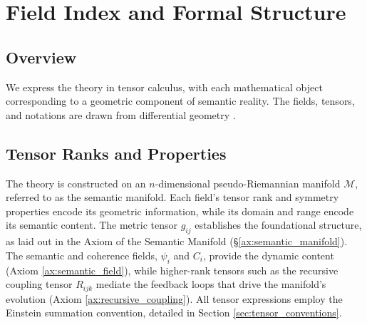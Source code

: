\chapter{Field Index and Formal Structure}

\section{Overview}

We express the theory in tensor calculus, with each mathematical object corresponding to a geometric component of semantic reality. The fields, tensors, and notations are drawn from differential geometry \autocite{Riemann1868, Lee2003}.

\section{Tensor Ranks and Properties}

The theory is constructed on an \(n\)-dimensional pseudo-Riemannian manifold \(\mathcal{M}\), referred to as the semantic manifold. Each field's tensor rank and symmetry properties encode its geometric information, while its domain and range encode its semantic content. The metric tensor \(g_{ij}\) establishes the foundational structure, as laid out in the Axiom of the Semantic Manifold (\S\ref{ax:semantic_manifold}). The semantic and coherence fields, \(\psi_i\) and \(C_i\), provide the dynamic content (Axiom \ref{ax:semantic_field}), while higher-rank tensors such as the recursive coupling tensor \(R_{ijk}\) mediate the feedback loops that drive the manifold's evolution (Axiom \ref{ax:recursive_coupling}). All tensor expressions employ the Einstein summation convention, detailed in Section \ref{sec:tensor_conventions}.


